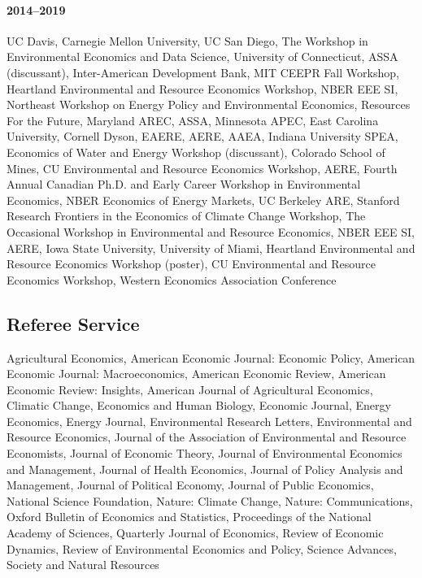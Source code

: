 \documentclass[11pt]{res} %
\begin{document}
\begin{resume}
\paragraph{2014--2019} UC Davis, Carnegie Mellon University, UC San Diego, The Workshop in Environmental Economics and Data Science, University of Connecticut, ASSA (discussant), Inter-American Development Bank, MIT CEEPR Fall Workshop, Heartland Environmental and Resource Economics Workshop, NBER EEE SI, Northeast Workshop on Energy Policy and Environmental Economics, Resources For the Future, Maryland AREC, ASSA, Minnesota APEC, East Carolina University, Cornell Dyson, EAERE, AERE, AAEA, Indiana University SPEA, Economics of Water and Energy Workshop (discussant), Colorado School of Mines, CU Environmental and Resource Economics Workshop, AERE, Fourth Annual Canadian Ph.D. and Early Career Workshop in Environmental Economics, NBER Economics of Energy Markets, UC Berkeley ARE, Stanford Research Frontiers in the Economics of Climate Change Workshop, The Occasional Workshop in Environmental and Resource Economics, NBER EEE SI, AERE, Iowa State University, University of Miami, Heartland Environmental and Resource Economics Workshop (poster), CU Environmental and Resource Economics Workshop, Western Economics Association Conference

\vspace{-.2in}

\subsection{Referee Service}\vspace{-.2in}
	Agricultural Economics,
	American Economic Journal: Economic Policy,
	American Economic Journal: Macroeconomics,
	American Economic Review,
	American Economic Review: Insights,
	American Journal of Agricultural Economics,
	Climatic Change,
	Economics and Human Biology,
	Economic Journal,
	Energy Economics,
	Energy Journal,
	Environmental Research Letters,
	Environmental and Resource Economics,
	Journal of the Association of Environmental and Resource Economists,
	Journal of Economic Theory,
	Journal of Environmental Economics and Management,
	Journal of Health Economics,
	Journal of Policy Analysis and Management,
	Journal of Political Economy,
	Journal of Public Economics,
	National Science Foundation,
	Nature: Climate Change,
	Nature: Communications,
	Oxford Bulletin of Economics and Statistics,
	Proceedings of the National Academy of Sciences,
	Quarterly Journal of Economics,
	Review of Economic Dynamics,
	Review of Environmental Economics and Policy,
	Science Advances,
	Society and Natural Resources


\end{resume}
\end{document}
